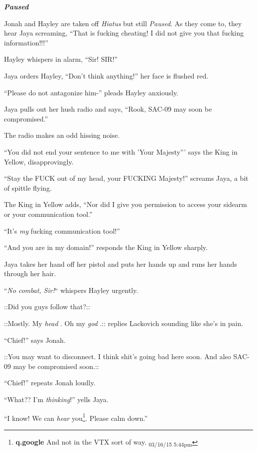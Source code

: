 \textit{\textbf{Paused}}

Jonah and Hayley are taken off \textit{Hiatus} but still \textit{Paused}.  As they come to, they hear Jaya screaming, ``That is fucking cheating!  I did not give you that fucking information!!!''

Hayley whispers in alarm, ``Sir! SIR!''

Jaya orders Hayley, ``Don't think anything!'' her face is flushed red.  

``Please do not antagonize him-'' pleads Hayley anxiously.

Jaya pulls out her hush radio and says, ``Rook, SAC-09 may soon be compromised.''

The radio makes an odd hissing noise.

``You did not end your sentence to me with 'Your Majesty''' says the King in Yellow, disapprovingly.

``Stay the FUCK out of my head, your FUCKING Majesty!'' screams Jaya, a bit of spittle flying.

The King in Yellow adds, ``Nor did I give you permission to access your sidearm or your communication tool.''

``It's \textit{my} fucking communication tool!''

``And you are in my domain!'' responds the King in Yellow sharply.

Jaya takes her hand off her pistol and puts her hands up and runs her hands through her hair.

``\textit{No combat, Sir!}`` whispers Hayley urgently.

 {\color[RGB]{255,0,0}::Did you guys follow that?::} 

 {\color[RGB]{74,134,232}::Mostly.  My } \textit{ {\color[RGB]{74,134,232}head} } {\color[RGB]{74,134,232}.  Oh my } \textit{ {\color[RGB]{74,134,232}god} } {\color[RGB]{74,134,232}.::}  replies Lackovich sounding like she's in pain.

``Chief!'' says Jonah.

 {\color[RGB]{255,0,0}::You may want to disconnect.  I think shit's going bad here soon.  And also SAC-09 may be compromised soon.::} 

``Chief!'' repeats Jonah loudly.

``What??  I'm \textit{thinking}!'' yells Jaya.

``I know!  We can \textit{hear} you\footnote{\textbf{q.google }And not in the VTX sort of way. \textsubscript{03/16/15 5:44pm}}.  Please calm down.''

